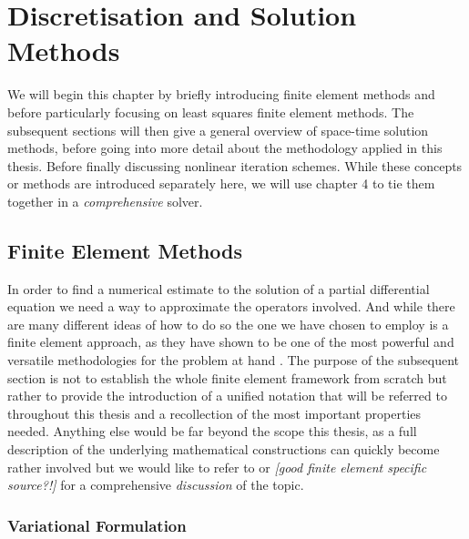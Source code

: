 \documentclass[../draft_1.tex]{subfiles}
\begin{document}
\chapter{Discretisation and Solution Methods}

We will begin this chapter by briefly introducing finite element methods and before particularly focusing on least squares finite element methods. The subsequent sections will then give a general overview of space-time solution methods, before going into more detail about the methodology applied in this thesis. Before finally discussing nonlinear iteration schemes. While these concepts or methods are introduced separately here, we will use chapter 4 to tie them together in a \textit{comprehensive} solver.


\section{Finite Element Methods}

In order to find a numerical estimate to the solution of a partial differential equation we need a way to approximate the operators involved. And while there are many different ideas of how to do so the one we have chosen to employ is a finite element approach, as they have shown to be one of the most powerful and versatile methodologies for the problem at hand \cite{bochev2009least}. The purpose of the subsequent section is not to establish the whole finite element framework from scratch but rather to provide the introduction of a unified notation that will be referred to throughout this thesis and a recollection of the most important properties needed. Anything else would be far beyond the scope this thesis, as a full description of the underlying mathematical constructions can quickly become rather involved but we would like to refer to \cite{evans2010partial} or \textit{[good finite element specific source?!]} for a comprehensive \textit{discussion} of the topic. 



\subsection{Variational Formulation}
\end{document}
